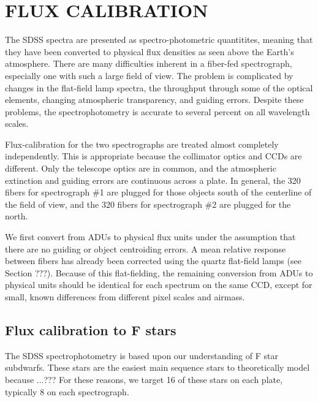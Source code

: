 \documentclass[12pt,preprint]{aastex}
\newcommand{\ergs}{{\rm ~erg~s}^{-1}}
\newcommand{\ergscmang}{{\rm ~erg~s}^{-1}{\rm cm}^{-2}{\rm\AA}^{-1}}
\begin{document}
\section{FLUX CALIBRATION}
\label{sec_fluxing}

The SDSS spectra are presented as spectro-photometric quantitites,
meaning that they have been converted to physical flux densities
as seen above the Earth's atmosphere.
There are many difficulties inherent in a fiber-fed spectrograph,
especially one with such a large field of view.
The problem is complicated by changes in the flat-field lamp spectra,
the throughput through some of the optical elements, changing
atmospheric transparency, and guiding errors.
Despite these problems, the spectrophotometry is accurate to
several percent on all wavelength scales.

Flux-calibration for the two spectrographs are treated almost completely
independently.  This is appropriate because the collimator optics
and CCDs are different.  Only the telescope optics are in common, and the
atmospheric extinction and guiding errors are continuous across a plate.
In general, the 320 fibers for spectrograph \#1 are plugged for those
objects south of the centerline of the field of view, and the 320 fibers
for spectrograph \#2 are plugged for the north.


We first convert from ADUs to physical flux units under the
assumption that there are no guiding or object centroiding errors.
A mean relative response between fibers has already been corrected
using the quartz flat-field lamps (see Section ???).
Because of this flat-fielding, the remaining conversion from ADUs
to physical units should be identical for each spectrum on the 
same CCD, except for small, known differences from different pixel scales
and airmass.

\subsection{Flux calibration to F stars}

The SDSS spectrophotometry is based upon our understanding
of F star subdwarfs.  These stars are the easiest main sequence
stars to theoretically model because ...???
For these reasons, we target 16 of these stars on each plate,
typically 8 on each spectrograph.
\end{document}
